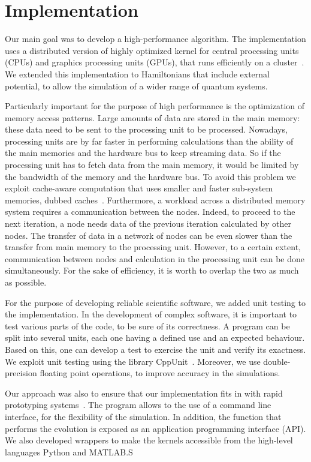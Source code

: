 \chapter{Implementation}
Our main goal was to develop a high-performance algorithm. The implementation uses a distributed version of highly optimized kernel for central processing units (CPUs) and graphics processing units (GPUs), that runs efficiently on a cluster~\citep{Wittek20131165}. We extended this implementation to Hamiltonians that include external potential, to allow the simulation of a wider range of quantum systems. 

Particularly important for the purpose of high performance is the optimization of memory access patterns. Large amounts of data are stored in the main memory: these data need to be sent to the processing unit to be processed. Nowadays, processing units are by far faster in performing calculations than the ability of the main memories and the hardware bus to keep streaming data. So if the processing unit has to fetch data from the main memory, it would be limited by the bandwidth of the memory and the hardware bus. To avoid this problem we exploit cache-aware computation that uses smaller and faster sub-system memories, dubbed caches~\citep{Handy}. 
Furthermore, a workload across a distributed memory system requires a communication between the nodes. Indeed, to proceed to the next iteration, a node needs data of the previous iteration calculated by other nodes. The transfer of data in a network of nodes can be even slower than the transfer from main memory to the processing unit. However, to a certain extent, communication between nodes and calculation in the processing unit can be done simultaneously. For the sake of efficiency, it is worth to overlap the two as much as possible.

For the purpose of developing reliable scientific software, we added unit testing to the implementation. In the development of complex software, it is important to test various parts of the code, to be sure of its correctness. A program can be split into several units, each one having a defined use and an expected behaviour. Based on this, one can develop a test to exercise the unit and verify its exactness. We exploit unit testing using the library CppUnit~\citep{CPPUnit}. Moreover, we use double-precision floating point operations, to improve accuracy in the simulations.

Our approach was also to ensure that our implementation fits in with rapid prototyping
systems~\citep{SmithMF}. The program allows to the use of a command line interface, for the flexibility of the simulation. In addition, the function that performs the evolution is exposed as an application programming interface (API). We also developed wrappers to make the kernels accessible from the  high-level languages Python and MATLAB.S

